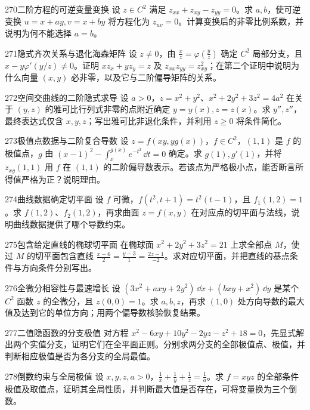 \begin{exercise}{270}{二阶方程的可逆变量变换}
设 $z\in C^2$ 满足 $z_{xx}+z_{xy}-z_{yy}=0$。求 $a,b$，使可逆变换 $u=x+ay,v=x+by$ 将方程化为 $z_{uv}=0$。计算变换后的非零比例系数，并说明为何不能选择 $a=b$。
\end{exercise}
\begin{exercise}{271}{隐式齐次关系与退化海森矩阵}
设 $z\ne0$，由 $\frac xz=\varphi(\frac yz)$ 确定 $C^2$ 局部分支，且 $x-y\varphi'(y/z)\ne0$。证明 $xz_x+yz_y=z$ 及 $z_{xx}z_{yy}=z_{xy}^2$；在第二个证明中说明为什么向量 $(x,y)$ 必非零，以及它与二阶偏导矩阵的关系。
\end{exercise}
\begin{exercise}{272}{空间交曲线的二阶隐式求导}
设 $a>0$，$z=x^2+y^2$、$x^2+2y^2+3z^2=4a^2$ 在关于 $(y,z)$ 的雅可比行列式非零的点附近确定 $y=y(x),z=z(x)$。求 $y'',z''$，最终表达式仅含 $x,y,z$；写出雅可比非退化条件，并利用 $z\ge0$ 将条件简化。
\end{exercise}
\begin{exercise}{273}{极值点数据与二阶复合导数}
设 $z=f(xy,yg(x))$，$f\in C^2$，$(1,1)$ 是 $f$ 的极值点，$g$ 由 $(x-1)^2-\int_x^{g(x)}e^{-t^2}\,\dd t=0$ 确定。求 $g(1),g'(1)$，并将 $z_{xy}(1,1)$ 用 $f$ 在 $(1,1)$ 的二阶偏导数表示。若该点为严格极小点，能否断言所得值严格为正？说明理由。
\end{exercise}
\begin{exercise}{274}{曲线数据确定切平面}
设 $f$ 可微，$f(t^2,t+1)=t^2(t-1)$，且 $f_1(1,2)=1$。求 $f(1,2)$、$f_2(1,2)$，再求曲面 $z=f(x,y)$ 在对应点的切平面与法线，说明曲线数据提供了哪个导数约束。
\end{exercise}
\begin{exercise}{275}{包含给定直线的椭球切平面}
在椭球面 $x^2+2y^2+3z^2=21$ 上求全部点 $M$，使过 $M$ 的切平面包含直线 $\frac{x-6}2=\frac{y-3}1=\frac{2z-1}{-2}$。求对应切平面，并把直线的基点条件与方向条件分别写出。
\end{exercise}
\begin{exercise}{276}{全微分相容性与最速增长}
设 $(3x^2+axy+2y^2)\,\dd x+(bxy+x^2)\,\dd y$ 是某个 $C^2$ 函数 $z$ 的全微分，且 $z(0,0)=1$。求 $a,b,z$，再求 $(1,0)$ 处方向导数的最大值及达到它的单位方向；用两个偏导数核验恢复结果。
\end{exercise}
\begin{exercise}{277}{二值隐函数的分支极值}
对方程 $x^2-6xy+10y^2-2yz-z^2+18=0$，先显式解出两个实值分支，证明它们在全平面正则。分别求两分支的全部极值点、极值，并判断相应极值是否为各分支的全局最值。
\end{exercise}
\begin{exercise}{278}{倒数约束与全局极值}
设 $x,y,z,a>0$，$\frac1x+\frac1y+\frac1z=\frac1a$。求 $f=xyz$ 的全部条件极值及取值点，证明其全局性质，并判断最大值是否存在，可将变量换为三个倒数。
\end{exercise}
